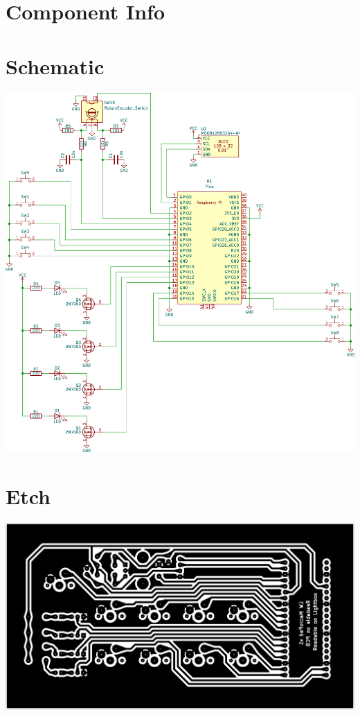 \section{Component Info}

\explainLed
\explainMosfet

\section{Schematic}
\includegraphics[width=\textwidth]{img/macropad-rev1-schematic.png}

\section{Etch}
\label{sec:etch}
\includegraphics[width=\textwidth]{img/macropad-rev1-B_Cu_Oversized.png}

